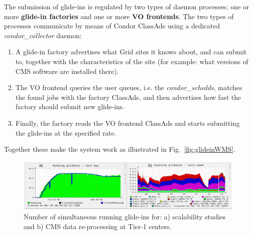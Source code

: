 \documentclass[a4paper]{jpconf}
\begin{document}
The submission of glide-ins is regulated by two types of daemon processes; 
one or more \textbf{glide-in factories} and one or more \textbf{VO frontends}. 
The two types of processes communicate by means of Condor ClassAds using a dedicated \emph{condor\_collector} daemon:
\begin{enumerate}
\item A glide-in factory advertises what Grid sites it knows about, and can submit to, together with the characteristics of the site 
(for example: what versions of CMS software are installed there).
\item The VO frontend queries the user queues, i.e. the \emph{condor\_schedds}, 
matches the found jobs with the factory ClassAds, 
and then advertises how fast the factory should submit new glide-ins.
\item Finally, the factory reads the VO frontend ClassAds and starts submitting the glide-ins at the specified rate.
\end{enumerate}

Together these make the system work as illustrated in Fig.~\ref{fig:glideinWMS}.
\begin{figure}
\begin{center}
\includegraphics[scale=0.55]{glideinT1stat}
\end{center}
\caption{Number of simultaneous running glide-ins for: a) scalability studies and b) CMS data re-processing at Tier-1 centers.}
\label{fig:glideinT1stat}
\end{figure}
\end{document}
